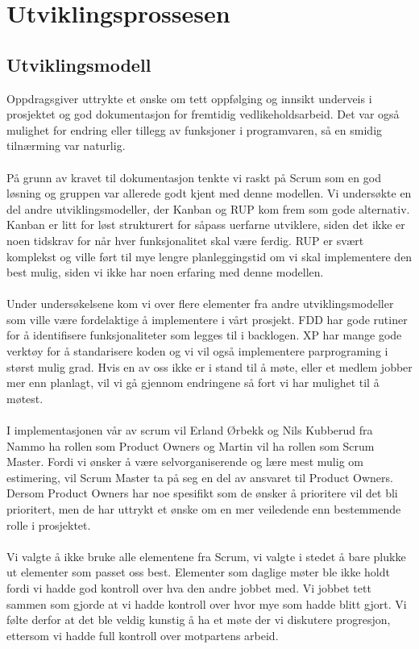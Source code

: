 \chapter{Utviklingsprossesen}
\label{chap:process}


\section{Utviklingsmodell}
Oppdragsgiver uttrykte et ønske om tett oppfølging og innsikt underveis i prosjektet og god dokumentasjon for fremtidig vedlikeholdsarbeid. Det var også mulighet for endring eller tillegg av funksjoner i programvaren, så en smidig tilnærming var naturlig. \\ \\
På grunn av kravet til dokumentasjon tenkte vi raskt på Scrum som en god løsning og gruppen var allerede godt kjent med denne modellen. Vi undersøkte en del andre utviklingsmodeller, der Kanban og RUP kom frem som gode alternativ. Kanban er litt for løst strukturert for såpass uerfarne utviklere, siden det ikke er noen tidskrav for når hver funksjonalitet skal være ferdig. RUP er svært komplekst og ville ført til mye lengre planleggingstid om vi skal implementere den best mulig, siden vi ikke har noen erfaring med denne modellen.\\ \\ 
Under undersøkelsene kom vi over flere elementer fra andre utviklingsmodeller som ville være fordelaktige å implementere i vårt prosjekt. FDD har gode rutiner for å identifisere funksjonaliteter som legges til i backlogen\cite{FDD}. XP har mange gode verktøy for å standarisere koden og vi vil også implementere parprograming i størst mulig grad. Hvis en av oss ikke er i stand til å møte, eller et medlem jobber mer enn planlagt, vil vi gå gjennom endringene så fort vi har mulighet til å møtest. \\ \\
I implementasjonen vår av scrum vil Erland Ørbekk og Nils Kubberud fra Nammo ha rollen som Product Owners og Martin vil ha rollen som Scrum Master. Fordi vi ønsker å være selvorganiserende og lære mest mulig om estimering, vil Scrum Master ta på seg en del av ansvaret til Product Owners. Dersom Product Owners har noe spesifikt som de ønsker å prioritere vil det bli prioritert, men de har uttrykt et ønske om en mer veiledende enn bestemmende rolle i prosjektet. \\ \\
Vi valgte å ikke bruke alle elementene fra Scrum, vi valgte i stedet å bare plukke ut elementer som passet oss best. Elementer som daglige møter ble ikke holdt fordi vi hadde god kontroll over hva den andre jobbet med. Vi jobbet tett sammen som gjorde at vi hadde kontroll over hvor mye som hadde blitt gjort. Vi følte derfor at det ble veldig kunstig å ha et møte der vi diskutere progresjon, ettersom vi hadde full kontroll over motpartens arbeid.\\ \\
